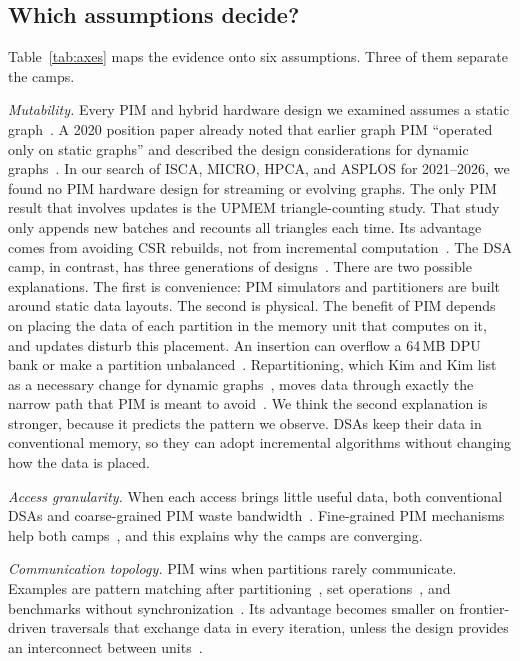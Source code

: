 \documentclass[journal,onecolumn]{IEEEtran}
\begin{document}
\subsection{Which assumptions decide?}
Table~\ref{tab:axes} maps the evidence onto six assumptions. Three of them separate the camps.

\emph{Mutability.} Every PIM and hybrid hardware design we examined assumes a static graph~\cite{ahn2015tesseract,zhang2018graphp,zhuo2019graphq,song2018graphr,shin2025piccolo,shin2025fala,yenimol2026cograf}. A 2020 position paper already noted that earlier graph PIM ``operated only on static graphs'' and described the design considerations for dynamic graphs~\cite{kim2020dynamic}. In our search of ISCA, MICRO, HPCA, and ASPLOS for 2021--2026, we found no PIM hardware design for streaming or evolving graphs. The only PIM result that involves updates is the UPMEM triangle-counting study. That study only appends new batches and recounts all triangles each time. Its advantage comes from avoiding CSR rebuilds, not from incremental computation~\cite{asquini2025tc}. The DSA camp, in contrast, has three generations of designs~\cite{rahman2021jetstream,zhao2022tdgraph,gao2023mega}. There are two possible explanations. The first is convenience: PIM simulators and partitioners are built around static data layouts. The second is physical. The benefit of PIM depends on placing the data of each partition in the memory unit that computes on it, and updates disturb this placement. An insertion can overflow a 64\,MB DPU bank or make a partition unbalanced~\cite{cai2024pimpam}. Repartitioning, which Kim and Kim list as a necessary change for dynamic graphs~\cite{kim2020dynamic}, moves data through exactly the narrow path that PIM is meant to avoid~\cite{gomezluna2022prim}. We think the second explanation is stronger, because it predicts the pattern we observe. DSAs keep their data in conventional memory, so they can adopt incremental algorithms without changing how the data is placed.

\emph{Access granularity.} When each access brings little useful data, both conventional DSAs and coarse-grained PIM waste bandwidth~\cite{shin2025piccolo}. Fine-grained PIM mechanisms help both camps~\cite{shin2025fala,yenimol2026cograf}, and this explains why the camps are converging.

\emph{Communication topology.} PIM wins when partitions rarely communicate. Examples are pattern matching after partitioning~\cite{cai2024pimpam}, set operations~\cite{besta2021sisa}, and benchmarks without synchronization~\cite{gomezluna2022prim}. Its advantage becomes smaller on frontier-driven traversals that exchange data in every iteration, unless the design provides an interconnect between units~\cite{zhuo2019graphq,barkhordar2025alphapim}.
\end{document}
